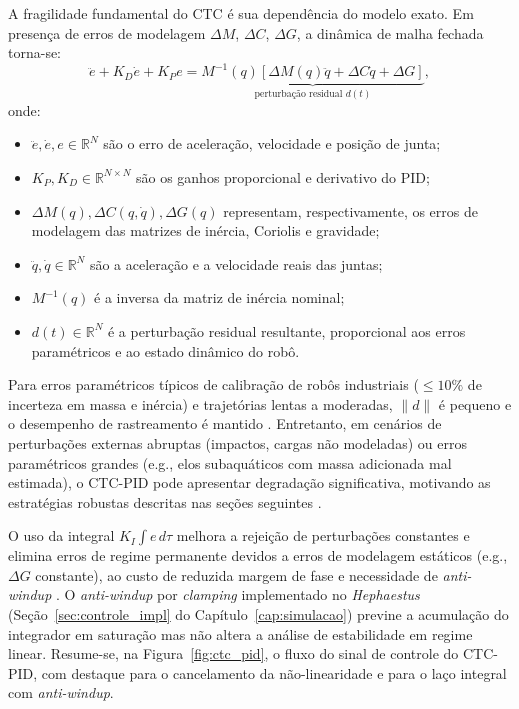 A fragilidade fundamental do CTC é sua dependência do modelo exato. Em presença de erros de modelagem $\Delta M$, $\Delta C$, $\Delta G$, a dinâmica de malha fechada torna-se:
\begin{equation}
    \ddot{e} + K_D\dot{e} + K_P e = \underbrace{M^{-1}(q)\left[\Delta M(q)\ddot{q} + \Delta C\dot{q} + \Delta G\right]}_{\text{perturbação residual } d(t)},
    \label{eq:ctc_robustness}
\end{equation}
onde:
\begin{itemize}
    \item $\ddot{e}, \dot{e}, e \in \mathbb{R}^N$ são o erro de aceleração, velocidade e posição de junta;
    \item $K_P, K_D \in \mathbb{R}^{N \times N}$ são os ganhos proporcional e derivativo do PID;
    \item $\Delta M(q), \Delta C(q,\dot{q}), \Delta G(q)$ representam, respectivamente, os erros de modelagem das matrizes de inércia, Coriolis e gravidade;
    \item $\ddot{q}, \dot{q} \in \mathbb{R}^N$ são a aceleração e a velocidade reais das juntas;
    \item $M^{-1}(q)$ é a inversa da matriz de inércia nominal;
    \item $d(t) \in \mathbb{R}^N$ é a perturbação residual resultante, proporcional aos erros paramétricos e ao estado dinâmico do robô.
\end{itemize} Para erros paramétricos típicos de calibração de robôs industriais ($\leq 10\%$ de incerteza em massa e inércia) e trajetórias lentas a moderadas, $\|d\|$ é pequeno e o desempenho de rastreamento é mantido \cite{spong2020robot}. Entretanto, em cenários de perturbações externas abruptas (impactos, cargas não modeladas) ou erros paramétricos grandes (e.g., elos subaquáticos com massa adicionada mal estimada), o CTC-PID pode apresentar degradação significativa, motivando as estratégias robustas descritas nas seções seguintes \cite{slotine1991applied, edwards1998sliding}.

O uso da integral $K_I\int e\,d\tau$ melhora a rejeição de perturbações constantes e elimina erros de regime permanente devidos a erros de modelagem estáticos (e.g., $\Delta G$ constante), ao custo de reduzida margem de fase e necessidade de \textit{anti-windup} \cite{astrom1995theory}. O \textit{anti-windup} por \textit{clamping} implementado no \textit{Hephaestus} (Seção~\ref{sec:controle_impl} do Capítulo~\ref{cap:simulacao}) previne a acumulação do integrador em saturação mas não altera a análise de estabilidade em regime linear. Resume-se, na Figura~\ref{fig:ctc_pid}, o fluxo do sinal de controle do CTC-PID, com destaque para o cancelamento da não-linearidade e para o laço integral com \textit{anti-windup}.

